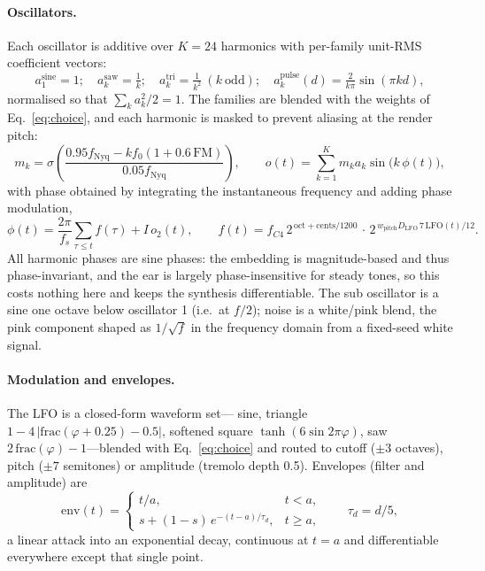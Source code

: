 \documentclass[11pt]{article}
\begin{document}
\paragraph{Oscillators.} Each oscillator is additive over $K=24$ harmonics with
per-family unit-RMS coefficient vectors:
\begin{equation}
a^{\text{sine}}_1 = 1;\quad a^{\text{saw}}_k = \tfrac{1}{k};\quad
a^{\text{tri}}_k = \tfrac{1}{k^2}\ (k\ \text{odd});\quad
a^{\text{pulse}}_k(d) = \tfrac{2}{k\pi}\sin(\pi k d),
\end{equation}
normalised so that $\sum_k a_k^2/2 = 1$. The families are blended with the
weights of Eq.~\eqref{eq:choice}, and each harmonic is masked to prevent
aliasing at the render pitch:
\begin{equation}
m_k = \sigma\!\left(\frac{0.95 f_{\text{Nyq}} - k f_0 (1 + 0.6\,\text{FM})}
{0.05 f_{\text{Nyq}}}\right),
\qquad
o(t) = \sum_{k=1}^{K} m_k a_k \sin\!\big(k\,\phi(t)\big),
\label{eq:osc}
\end{equation}
with phase obtained by integrating the instantaneous frequency and adding phase
modulation,
\begin{equation}
\phi(t) = \frac{2\pi}{f_s}\sum_{\tau \le t} f(\tau) + I\, o_2(t),\qquad
f(t) = f_{C4}\, 2^{\,\text{oct} + \text{cents}/1200}\, \cdot\,
2^{\,w_{\text{pitch}} D_{\text{LFO}}\, 7\, \text{LFO}(t)/12}.
\end{equation}
All harmonic phases are sine phases: the embedding is magnitude-based and thus
phase-invariant, and the ear is largely phase-insensitive for steady tones, so
this costs nothing here and keeps the synthesis differentiable. The sub
oscillator is a sine one octave below oscillator 1 (i.e.\ at $f/2$); noise is a
white/pink blend, the pink component shaped as $1/\sqrt{f}$ in the frequency
domain from a fixed-seed white signal.

\paragraph{Modulation and envelopes.} The LFO is a closed-form waveform set---
sine, triangle $1 - 4\,|\mathrm{frac}(\varphi{+}0.25) - 0.5|$, softened square
$\tanh(6\sin 2\pi\varphi)$, saw $2\,\mathrm{frac}(\varphi)-1$---blended with
Eq.~\eqref{eq:choice} and routed to cutoff ($\pm3$ octaves), pitch
($\pm7$ semitones) or amplitude (tremolo depth 0.5). Envelopes (filter and
amplitude) are
\begin{equation}
\mathrm{env}(t) = \begin{cases} t/a, & t < a,\\[2pt]
s + (1-s)\,e^{-(t-a)/\tau_d}, & t \ge a,\end{cases}
\qquad \tau_d = d/5,
\label{eq:env}
\end{equation}
a linear attack into an exponential decay, continuous at $t=a$ and
differentiable everywhere except that single point.
\end{document}

